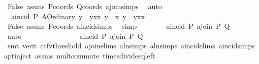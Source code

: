 \begin{isabellebody}
\ False\ assms\ Pcoords\ Qcoords\ a{}join{\isachardot}{\kern0pt}simps\ \isamarkupfalse%
\ auto\isanewline
\ \ \ \ \ \ \isamarkupfalse%
\ {}{\isacharcolon}{\kern0pt}\ {\isachardoublequoteopen}a{}incid\ P\ {\isacharparenleft}{\kern0pt}A{}Ordinary\ {\isacharparenleft}{\kern0pt}{\isacharparenleft}{\kern0pt}y{}\ {\isacharminus}{\kern0pt}\ y{}{\isacharparenright}{\kern0pt}{\isacharslash}{\kern0pt}{\isacharparenleft}{\kern0pt}x{}{\isacharminus}{\kern0pt}x{}{\isacharparenright}{\kern0pt}{\isacharparenright}{\kern0pt}\ {\isacharparenleft}{\kern0pt}y{}\ {\isacharminus}{\kern0pt}\ x{}{\isacharasterisk}{\kern0pt}\ {\isacharparenleft}{\kern0pt}y{}\ {\isacharminus}{\kern0pt}\ y{}{\isacharparenright}{\kern0pt}{\isacharslash}{\kern0pt}{\isacharparenleft}{\kern0pt}x{}{\isacharminus}{\kern0pt}x{}{\isacharparenright}{\kern0pt}{\isacharparenright}{\kern0pt}{\isacharparenright}{\kern0pt}{\isachardoublequoteclose}\ \isamarkupfalse%
\ False\ assms\ Pcoords\ a{}incid{\isachardot}{\kern0pt}simps\ \isamarkupfalse%
\ simp\isanewline
\ \ \ \ \ \ \isamarkupfalse%
\ {\isachardoublequoteopen}a{}incid\ P\ {\isacharparenleft}{\kern0pt}a{}join\ P\ Q{\isacharparenright}{\kern0pt}{\isachardoublequoteclose}\ \isamarkupfalse%
\ {}\ {}\ \isamarkupfalse%
\ auto\isanewline
\ \ \ \ \isamarkupfalse%
\ \isanewline
\ \ \isamarkupfalse%
\isanewline
\ \ \ \ \isamarkupfalse%
\ {}{\isacharcolon}{\kern0pt}\ {\isachardoublequoteopen}a{}incid\ P\ {\isacharparenleft}{\kern0pt}a{}join\ P\ Q{\isacharparenright}{\kern0pt}{\isachardoublequoteclose}\ \isanewline
\ \ \ \ \ \ \isamarkupfalse%
\ {\isacharparenleft}{\kern0pt}smt\ {\isacharparenleft}{\kern0pt}verit{\isacharcomma}{\kern0pt}\ ccfv{\isacharunderscore}{\kern0pt}threshold{\isacharparenright}{\kern0pt}\ a{}join{\isachardot}{\kern0pt}elims\ a{}ln{\isachardot}{\kern0pt}simps{\isacharparenleft}{\kern0pt}{}{\isacharparenright}{\kern0pt}\ a{}ln{\isachardot}{\kern0pt}simps{\isacharparenleft}{\kern0pt}{}{\isacharparenright}{\kern0pt}\ a{}incid{\isachardot}{\kern0pt}elims{\isacharparenleft}{\kern0pt}{}{\isacharparenright}{\kern0pt}\ a{}incid{\isachardot}{\kern0pt}simps{\isacharparenleft}{\kern0pt}{}{\isacharparenright}{\kern0pt}\ a{}pt{\isachardot}{\kern0pt}inject\ assms{\isacharparenleft}{\kern0pt}{}{\isacharparenright}{\kern0pt}\ mult{\isachardot}{\kern0pt}commute\ times{\isacharunderscore}{\kern0pt}divide{\isacharunderscore}{\kern0pt}eq{\isacharunderscore}{\kern0pt}left{\isacharparenright}{\kern0pt}\isanewline

\end{isabellebody}
